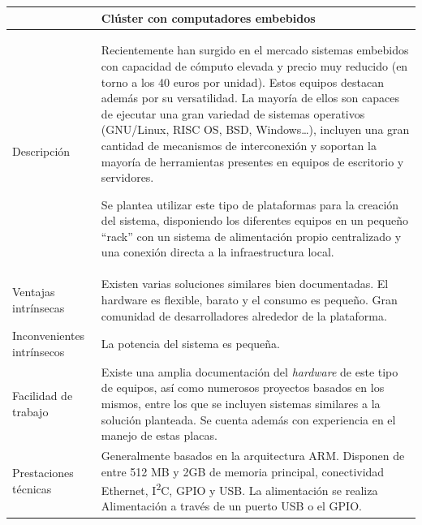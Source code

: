 \begin{table}[H]
\begin{tabular}{|p{2.4cm}|p{12cm}|}
\hline
&\textbf{Clúster con computadores embebidos}\\
\hline
Descripción&Recientemente han surgido en el mercado sistemas embebidos con capacidad de cómputo elevada y precio muy reducido (en torno a los 40 euros por unidad). Estos equipos destacan además por su versatilidad. La mayoría de ellos son capaces de ejecutar una gran variedad de sistemas operativos (GNU/Linux, RISC OS, BSD, Windows\dots), incluyen una gran cantidad de mecanismos de interconexión y soportan la mayoría de herramientas presentes en equipos de escritorio y servidores.

Se plantea utilizar este tipo de plataformas para la creación del sistema, disponiendo los diferentes equipos en un pequeño ``rack'' con un sistema de alimentación propio centralizado y una conexión directa a la infraestructura local.\\
\hline
Ventajas intrínsecas&Existen varias soluciones similares bien documentadas.
El hardware es flexible, barato y el consumo es pequeño.
Gran comunidad de desarrolladores alrededor de la plataforma.\\
\hline
Inconvenientes intrínsecos&La potencia del sistema es pequeña.\\
\hline
Facilidad de trabajo&Existe una amplia documentación del \textit{hardware} de este tipo de equipos, así como numerosos proyectos basados en los mismos, entre los que se incluyen sistemas similares a la solución planteada. Se cuenta además con experiencia en el manejo de estas placas.\\
\hline
Prestaciones técnicas&Generalmente basados en la arquitectura ARM. Disponen de entre 512 MB y 2GB de memoria principal, conectividad Ethernet, I\textsuperscript{2}C, GPIO y USB. La alimentación se realiza Alimentación a través de un puerto USB o el GPIO.

\end{tabular}
\end{table}
